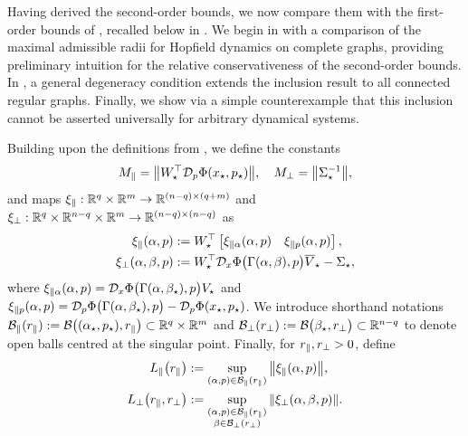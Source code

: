 \documentclass[a4paper]{cas-dc}
\begin{document}
Having derived the second-order bounds, we now compare them with the first-order bounds of \cite{gupta2025bounds}, recalled below in . We begin in  with a comparison of the maximal admissible radii for Hopfield dynamics on complete graphs, providing preliminary intuition for the relative conservativeness of the second-order bounds. In , a general degeneracy condition extends the inclusion result to all connected regular graphs. Finally, we show via a simple counterexample that this inclusion cannot be asserted universally for arbitrary dynamical systems.

\begin{theorem}
    \label{thm:lsr1}
    \cite[Theorem~3.3]{gupta2025bounds}
    Building upon the definitions from , we define the constants
    \begin{equation}
        M_{\parallel} = \norm{W_{\star }^{\top} \mathcal{D}_{p}\Phi(x_{\star},p_{\star})}, \quad M_{\perp} = \norm{\Sigma_{\star }^{-1}},
        \label{def:lsr1-M}
    \end{equation}
    and maps \(\xi_{\parallel} : \R[q] \times \R[m] \to \R[(n-q)\times(q+m)]\) and \(\xi_{\perp} : \R[q] \times \R[n-q] \times \R[m] \to \R[(n-q)\times(n-q)]\) as
    \begin{subequations}
        \begin{align}
            \xi_{\parallel}(\alpha,p) & := W_{\star }^{\top}\begin{bmatrix} \xi_{\parallel\alpha}(\alpha,p) & \xi_{\parallel p}(\alpha,p) \end{bmatrix}, \label{def:xi_para} \\
            \xi_{\perp}(\alpha,\beta,p) & := W_{\star }^{\top}\mathcal{D}_{x}\Phi\bigl(\Gamma(\alpha,\beta),p\bigr)\overline{V}_{\star } - \Sigma_{\star }, \label{def:xi_perp}
        \end{align} \label{def:lsr1-xi}
    \end{subequations}
    where \(\xi_{\parallel\alpha}(\alpha,p) = \mathcal{D}_{x}\Phi\bigl(\Gamma(\alpha,\beta_{\star}),p\bigr)V_{\star }\) and \(\xi_{\parallel p}(\alpha,p) = \mathcal{D}_{p}\Phi\bigl(\Gamma(\alpha,\beta_{\star}),p\bigr)-\mathcal{D}_{p}\Phi(x_{\star},p_{\star})\). We introduce shorthand notations \(\Bpr[\rpr] := \Bpara[\rpr] \subset \R[q] \times \R[m]\) and \(\Bpp[\rpp] := \Bperp[\rpp] \subset \R[n-q]\) to denote open balls centred at the singular point. Finally, for \(r_{\parallel},r_{\perp} > 0\), define
    \begin{subequations}
        \begin{align}
            \Lpr & := \sup_{(\A,p) \in \Bpr[\rpr]} \norm{\xipr{p}}, \label{def:L_para} \\
            \Lpp & := \sup_{\substack{(\A,p) \in \Bpr[\rpr]                            \\ \B \in \Bpp[\rpp]}} \norm{\xipp{p}}. \label{def:L_perp}

\end{align}
\end{subequations}
\end{theorem}
\end{document}
